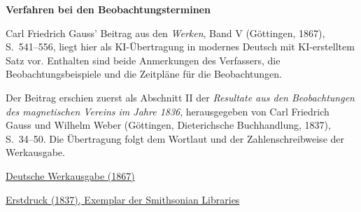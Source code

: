 \clearpage
\thispagestyle{empty}
\begin{center}\Large\textbf{Verfahren bei den Beobachtungsterminen}\end{center}

Carl Friedrich Gauss’ Beitrag aus den \textit{Werken}, Band V (Göttingen, 1867), S.~541--556, liegt hier als KI-Übertragung in modernes Deutsch mit KI-erstelltem Satz vor. Enthalten sind beide Anmerkungen des Verfassers, die Beobachtungsbeispiele und die Zeitpläne für die Beobachtungen.

Der Beitrag erschien zuerst als Abschnitt II der \textit{Resultate aus den Beobachtungen des magnetischen Vereins im Jahre 1836}, herausgegeben von Carl Friedrich Gauss und Wilhelm Weber (Göttingen, Dieterichsche Buchhandlung, 1837), S.~34--50. Die Übertragung folgt dem Wortlaut und der Zahlenschreibweise der Werkausgabe.

\medskip\noindent
\href{https://gdz.sub.uni-goettingen.de/id/PPN236006339}{Deutsche Werkausgabe (1867)}\par
\noindent\href{https://archive.org/details/ResultateausdenBd1Gaus/page/n39/mode/2up}{Erstdruck (1837), Exemplar der Smithsonian Libraries}
\clearpage
